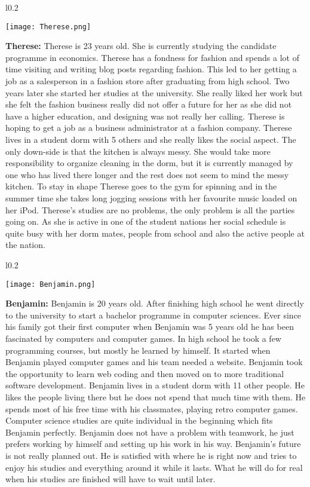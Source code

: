 \begin{wrapfigure}{l}{0.2\textwidth}
  \begin{center}
    \texttt{[image: Therese.png]}
  \end{center}
\end{wrapfigure}
\textbf {Therese:} Therese is 23 years old. She is currently studying the candidate programme in economics. Therese has a fondness for fashion and spends a lot of time visiting and writing blog posts regarding fashion. This led to her getting a job as a salesperson in a fashion store after graduating from high school. Two years later she started her studies at the university. She really liked her work but she felt the fashion business really did not offer a future for her as she did not have a higher education, and designing was not really her calling. Therese is hoping to get a job as a business administrator at a fashion company. 
Therese lives in a student dorm with 5 others and she really likes the social aspect. The only down-side is that the kitchen is always messy. She would take more responsibility to organize cleaning in the dorm, but it is currently managed by one who has lived there longer and the rest does not seem to mind the messy kitchen. 
To stay in shape Therese goes to the gym for spinning and in the summer time she takes long jogging sessions with her favourite music loaded on her iPod. Therese's studies are no problems, the only problem is all the parties going on. As she is active in one of the student nations her social schedule is quite busy with her dorm mates, people from school and also the active people at the nation.

\begin{wrapfigure}{l}{0.2\textwidth}
  \begin{center}
    \texttt{[image: Benjamin.png]}
  \end{center}
\end{wrapfigure}
\textbf {Benjamin:} Benjamin is 20 years old. After finishing high school he went directly to the university to start a bachelor programme in computer sciences. Ever since his family got their first computer when Benjamin was 5 years old he has been fascinated by computers and computer games. In high school he took a few programming courses, but mostly he learned by himself. It started when Benjamin played computer games and his team needed a website. Benjamin took the opportunity to learn web coding and then moved on to more traditional software development.
Benjamin lives in a student dorm with 11 other people. He likes the people living there but he does not spend that much time with them. He spends most of his free time with his classmates, playing retro computer games.
Computer science studies are quite individual in the beginning which fits Benjamin perfectly. Benjamin does not have a problem with teamwork, he just prefers working by himself and setting up his work in his way. Benjamin's future is not really planned out. He is satisfied with where he is right now and tries to enjoy his studies and everything around it while it lasts. What he will do for real when his studies are finished will have to wait until later.

